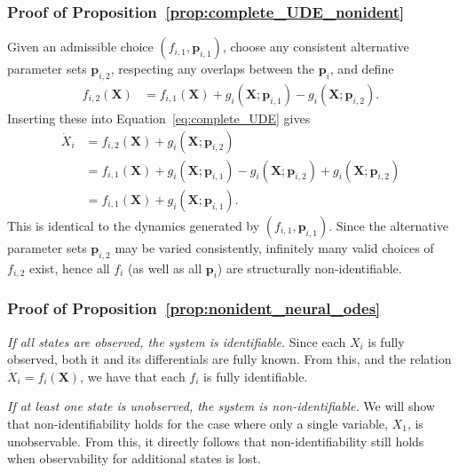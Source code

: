 \documentclass{article}
\theoremstyle{plain}
\theoremstyle{definition}
\renewcommand{\vec}[1]{\boldsymbol{#1}}
\begin{document}
{\subsubsection{Proof of Proposition~\ref{prop:complete_UDE_nonident}} \label{appendix:proof_complete_UDE}

Given an admissible choice $(f_{i,1}, \vec{p}_{i,1})$, choose any consistent alternative parameter sets $\vec{p}_{i,2}$, respecting any overlaps between the $\vec{p}_i$, and define
\begin{align*}
    f_{i,2}(\vec{X}) &= f_{i,1}(\vec{X}) + g_i(\vec{X};\vec{p}_{i,1}) - g_i(\vec{X};\vec{p}_{i,2}).
\end{align*}
Inserting these into Equation~\eqref{eq:complete_UDE} gives
\begin{align*}
    \dot{X}_i &= f_{i,2}(\vec{X}) + g_i(\vec{X};\vec{p}_{i,2}) \\
              &= f_{i,1}(\vec{X}) + g_i(\vec{X};\vec{p}_{i,1}) - g_i(\vec{X};\vec{p}_{i,2}) + g_i(\vec{X};\vec{p}_{i,2}) \\
              &= f_{i,1}(\vec{X}) + g_i(\vec{X};\vec{p}_{i,1}).
\end{align*}
This is identical to the dynamics generated by $(f_{i,1}, \vec{p}_{i,1})$. Since the alternative parameter sets $\vec{p}_{i,2}$ may be varied consistently, infinitely many valid choices of $f_{i,2}$ exist, hence all $f_i$ (as well as all $\vec{p}_i$) are structurally non-identifiable.

\subsubsection{Proof of Proposition~\ref{prop:nonident_neural_odes}} \label{appendix:proof_neural_odes}

\textit{If all states are observed, the system is identifiable.} Since each $X_i$ is fully observed, both it and its differentials are fully known. From this, and the relation $\dot{X}_i = f_i(\vec{X})$, we have that each $f_i$ is fully identifiable.

\medskip\noindent
\textit{If at least one state is unobserved, the system is non-identifiable.} We will show that non-identifiability holds for the case where only a single variable, $X_1$, is unobservable. From this, it directly follows that non-identifiability still holds when observability for additional states is lost.

}
\end{document}
